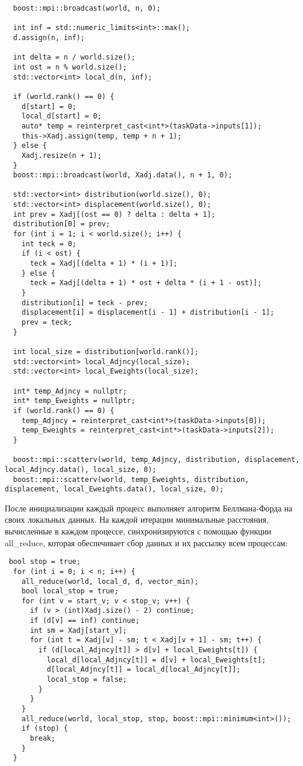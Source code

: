 \documentclass[a4paper, 14pt]{article}
\begin{document}
	\vspace{-1em}
	\begin{verbatim}
  boost::mpi::broadcast(world, n, 0);

  int inf = std::numeric_limits<int>::max();
  d.assign(n, inf);

  int delta = n / world.size();
  int ost = n % world.size();
  std::vector<int> local_d(n, inf);

  if (world.rank() == 0) {
    d[start] = 0;
    local_d[start] = 0;
    auto* temp = reinterpret_cast<int*>(taskData->inputs[1]);
    this->Xadj.assign(temp, temp + n + 1);
  } else {
    Xadj.resize(n + 1);
  }
  boost::mpi::broadcast(world, Xadj.data(), n + 1, 0);

  std::vector<int> distribution(world.size(), 0);
  std::vector<int> displacement(world.size(), 0);
  int prev = Xadj[(ost == 0) ? delta : delta + 1];
  distribution[0] = prev;
  for (int i = 1; i < world.size(); i++) {
    int teck = 0;
    if (i < ost) {
      teck = Xadj[(delta + 1) * (i + 1)];
    } else {
      teck = Xadj[(delta + 1) * ost + delta * (i + 1 - ost)];
    }
    distribution[i] = teck - prev;
    displacement[i] = displacement[i - 1] + distribution[i - 1];
    prev = teck;
  }

  int local_size = distribution[world.rank()];
  std::vector<int> local_Adjncy(local_size);
  std::vector<int> local_Eweights(local_size);

  int* temp_Adjncy = nullptr;
  int* temp_Eweights = nullptr;
  if (world.rank() == 0) {
    temp_Adjncy = reinterpret_cast<int*>(taskData->inputs[0]);
    temp_Eweights = reinterpret_cast<int*>(taskData->inputs[2]);
  }

  boost::mpi::scatterv(world, temp_Adjncy, distribution, displacement, local_Adjncy.data(), local_size, 0);
  boost::mpi::scatterv(world, temp_Eweights, distribution, displacement, local_Eweights.data(), local_size, 0);
	\end{verbatim}
После инициализации каждый процесс выполняет алгоритм Беллмана-Форда на своих локальных данных. На каждой итерации минимальные расстояния, вычисленные в каждом процессе, синхронизируются с помощью функции all\_reduce, которая обеспечивает сбор данных и их рассылку всем процессам:
	\vspace{-1em}
	\begin{verbatim}
 bool stop = true;
  for (int i = 0; i < n; i++) {
    all_reduce(world, local_d, d, vector_min);
    bool local_stop = true;
    for (int v = start_v; v < stop_v; v++) {
      if (v > (int)Xadj.size() - 2) continue;
      if (d[v] == inf) continue;
      int sm = Xadj[start_v];
      for (int t = Xadj[v] - sm; t < Xadj[v + 1] - sm; t++) {
        if (d[local_Adjncy[t]] > d[v] + local_Eweights[t]) {
          local_d[local_Adjncy[t]] = d[v] + local_Eweights[t];
          d[local_Adjncy[t]] = local_d[local_Adjncy[t]];
          local_stop = false;
        }
      }
    }
    all_reduce(world, local_stop, stop, boost::mpi::minimum<int>());
    if (stop) {
      break;
    }
  }
	\end{verbatim}	
\end{document}
